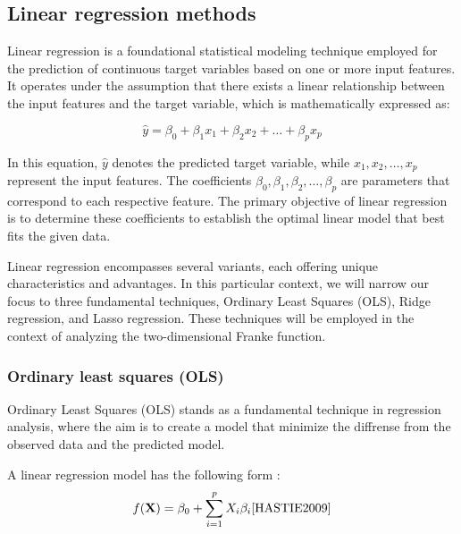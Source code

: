 \thispagestyle{plain}

\subsection{Linear regression methods}

\noindent Linear regression is a foundational statistical modeling technique employed for the prediction of continuous target variables
based on one or more input features. It operates under the assumption that there exists a linear relationship between the input features
and the target variable, which is mathematically expressed as:

\begin{equation}\label{eq:linear_regression} 
\hat{y} = \beta_0 + \beta_1 x_1 + \beta_2 x_2 + \ldots + \beta_p x_p 
\end{equation}

In this equation, $\hat{y}$ denotes the predicted target variable, while $x_1, x_2, \ldots, x_p$ represent the input features. The 
coefficients $\beta_0, \beta_1, \beta_2, \ldots, \beta_p$ are parameters that correspond to each respective feature. The primary objective 
of linear regression is to determine these coefficients to establish the optimal linear model that best fits the given data.

Linear regression encompasses several variants, each offering unique characteristics and advantages. In this particular context, 
we will narrow our focus to three fundamental techniques, Ordinary Least Squares (OLS), Ridge regression, and Lasso regression. These 
techniques will be employed in the context of analyzing the two-dimensional Franke function. 


\subsubsection{Ordinary least squares (OLS)}
\noindent Ordinary Least Squares (OLS) stands as a fundamental technique in regression
analysis, where the aim is to create a model that minimize the diffrense from
the observed data and the predicted model. 


A linear regression model has the following form :
\begin{align}\label{eq:linear_model}
    f(\textbf{X}) = \beta_0 + \sum^{p}_{i=1} X_i \beta_i  \text{\cite{HASTIE2009}} \\%
\end{align}

